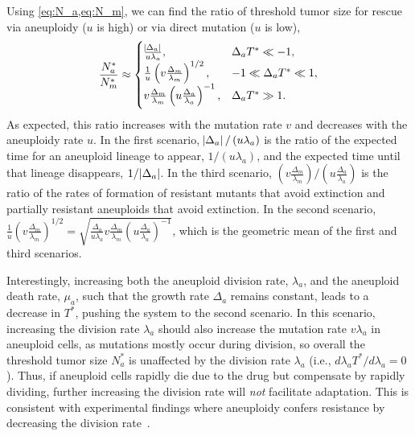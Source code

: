 \documentclass[12pt]{extarticle}
\begin{document}
Using \cref{eq:N_a,eq:N_m}, we can find the ratio of threshold tumor size for rescue via aneuploidy ($u$ is high) or via direct mutation ($u$ is low),
\begin{equation} \label{eq:N_ratio}
\frac{N^*_a}{N^*_m} \approx \begin{cases}
    \frac{\abs{\Delta_a}}{u\lambda_a} ,&
  \Delta_a T^* \ll -1 ,\\ 
  \frac{1}{u}\left(v  \frac{\Delta_m}{\lambda_m}\right)^{1/2} ,&
  -1 \ll \Delta_a T^* \ll 1  ,\\ 
  v \frac{\Delta_m}{\lambda_m}  \left(u\frac{\Delta_a}{\lambda_a}\right)^{-1}  ,&
   \Delta_a T^* \gg 1 .
  \end{cases}
\end{equation}
As expected, this ratio increases with the mutation rate $v$ and decreases with the aneuploidy rate $u$.
In the first scenario, $\abs{\Delta_a}/\left(u\lambda_a\right)$ is  the ratio of the expected time for an aneuploid lineage to appear, $1/\left(u\lambda_a\right)$, and the expected time until that lineage disappears, $1/\abs{\Delta_a}$.
In the third scenario, $\left(v \frac{\Delta_m}{\lambda_m}\right) / \left(u \frac{\Delta_a}{\lambda_a}\right)$ is the ratio of the rates of formation of resistant mutants that avoid extinction and partially resistant aneuploids that avoid extinction.
In the second scenario, $\frac{1}{u}\left(v  \frac{\Delta_m}{\lambda_m}\right)^{1/2}=\sqrt{\frac{\Delta_a}{u\lambda_a}  v \frac{\Delta_m}{\lambda_m}  \left(u\frac{\Delta_a}{\lambda_a}\right)^{-1}}$, which is the geometric mean of the first and third scenarios.

Interestingly, increasing both the aneuploid division rate, $\lambda_a$, and the aneuploid death rate, $\mu_a$, such that the growth rate $\Delta_a$ remains constant, leads to a decrease in $T^*$, pushing the system to the second scenario. In this scenario, increasing the division rate $\lambda_a$ should also increase the mutation rate $v\lambda_a$ in aneuploid cells, as mutations mostly occur during division, so overall the threshold tumor size $N_a^*$ is unaffected by the division rate $\lambda_a$ (i.e., $d \lambda_a T^*/d\lambda_a = 0$). Thus, if aneuploid cells rapidly die due to the drug but compensate by rapidly dividing, further increasing  the division rate will \emph{not} facilitate adaptation.
This is consistent with experimental findings where aneuploidy confers resistance by decreasing the division rate~\citep{replogle2020aneuploidy}.
\end{document}
